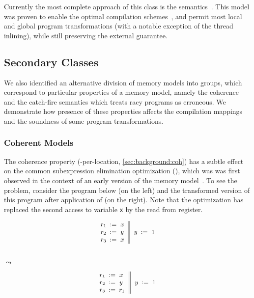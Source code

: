 Currently the most complete approach of this class 
is the \Promising semantics~\cite{Kang-al:POPL17, Lee-al:PLDI20}. 
This model was proven to enable the optimal compilation schemes~\cite{Podkopaev-al:POPL19}, 
and permit most local and global program transformations
(with a notable exception of the thread inlining), 
while still preserving the external \DRF guarantee.

\subsection{Secondary Classes}
\label{sec:analysis:other}

We also identified an alternative division of memory models into groups, 
which correspond to particular properties of a memory model, 
namely the coherence and the catch-fire semantics which treats racy programs 
as erroneous. We demonstrate how presence of these properties 
affects the compilation mappings and the soundness of some program transformations.

\subsubsection{Coherent Models}
\label{sec:analysis:coh}

The coherence property (\ie \SC-per-location, \cref{sec:background:coh})
has a subtle effect on the common subexpression elimination optimization (\CSE),
which was was first observed in the context of an early version of the \Java 
memory model~\cite{Pugh:JAVA99}.
To see the problem, consider the program below
(on the left) and the transformed version 
of this program after application of \CSE (on the right).
Note that the optimization has replaced 
the second access to variable \texttt{x}
by the read from register. 

\begin{minipage}{0.45\linewidth}
\begin{equation*}
\small
\inarrII{
  \readInst{}{r_1}{x}      \\
  \readInst{}{r_2}{y}      \\
  \readInst{}{r_3}{x}      \\
}{
  \writeInst{}{y}{1}       \\
}
\label{ex:coh-rr}
\end{equation*}
\end{minipage}\hfill%
\begin{minipage}{0.05\linewidth}
\Large~\\ $\leadsto$
\end{minipage}\hfill%
\begin{minipage}{0.45\linewidth}
\begin{equation*}
\small
\inarrII{
  \readInst{}{r_1}{x}      \\
  \readInst{}{r_2}{y}      \\
  \assignInst{r_3}{r_1}    \\
}{
  \writeInst{}{y}{1}       \\
}
\label{ex:coh-rr}
\end{equation*}
\end{minipage}

